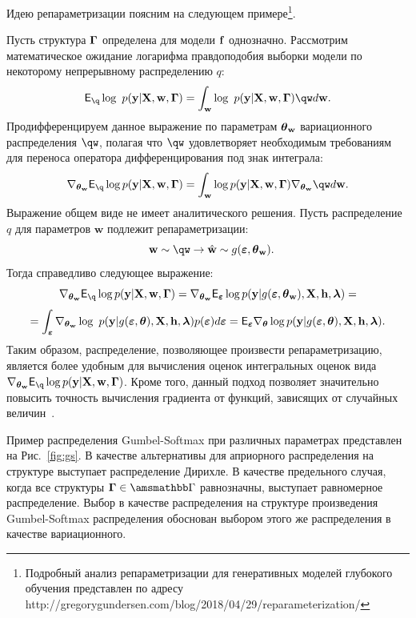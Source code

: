 Идею репараметризации поясним на следующем примере\footnote{Подробный анализ репараметризации для генеративных моделей глубокого обучения представлен по адресу http://gregorygundersen.com/blog/2018/04/29/reparameterization/}.
\begin{example} Пусть структура $\boldsymbol{\Gamma}$ определена для модели $\mathbf{f}$ однозначно. Рассмотрим математическое ожидание логарифма правдоподобия выборки модели по некоторому непрерывному распределению $q$:
\[
    \E_{\q} \log~\LL=  \int_{\w} \log~\LL \qw d\w.
\]
Продифференцируем данное выражение по параметрам $\boldsymbol{\theta}_\mathbf{w}$ вариационного распределения $\qw$, полагая что $\qw$ удовлетворяет необходимым требованиям для переноса оператора дифференцирования под знак интеграла:
\[
    \nabla_{\tetaw} \E_{\q} \log \LL = 
\int_{\w}  \log \LL \nabla_{\tetaw}\qw d\w.
\]
Выражение общем виде не имеет аналитического решения. Пусть распределение $q$ для параметров $\mathbf{w}$ подлежит репараметризации:
\[
    \w \sim \qw \to \hat{\w} \sim g(\boldsymbol{\varepsilon},\tetaw).
\] 
Тогда справедливо следующее выражение:
\[
 \nabla_{\tetaw} \E_{\q} \log \LL = \nabla_{\tetaw} \E_{\boldsymbol{\varepsilon}} \log p(\y|g(\boldsymbol{\varepsilon}, \tetaw), \X, \h, \lam) =
\]
\[= \int_{\boldsymbol{\varepsilon}}\nabla_{\boldsymbol{\theta}_\mathbf{w}} \log~p(\mathbf{y}|g(\boldsymbol{\varepsilon},\boldsymbol{\theta}), \mathbf{X}, \mathbf{h},\boldsymbol{\lambda}) p(\boldsymbol{\varepsilon}) d\boldsymbol{\varepsilon}=\mathsf{E}_{\boldsymbol{\varepsilon}} \nabla_{\boldsymbol{\theta}} \log p(\mathbf{y}|g(\boldsymbol{\varepsilon}, \boldsymbol{\theta}), \mathbf{X}, \mathbf{h}, \boldsymbol{\lambda}).\]
Таким образом, распределение, позволяющее произвести репараметризацию, является более удобным для вычисления оценок интегральных оценок вида $ \nabla_{\tetaw} \E_{\q} \log \LL$.
Кроме того, данный подход позволяет значительно повысить точность вычисления градиента от функций, зависящих от случайных величин~\cite{reparametrization}.
\end{example}

Пример распределения Gumbel-Softmax при различных параметрах представлен на Рис.~\ref{fig:gs}. В качестве альтернативы для априорного распределения на структуре выступает  распределение Дирихле. В качестве предельного случая, когда все структуры $\G \in \Gb$ равнозначны, выступает равномерное распределение. Выбор в качестве распределения на структуре произведения Gumbel-Softmax распределения обоснован выбором этого же распределения в качестве вариационного. 

